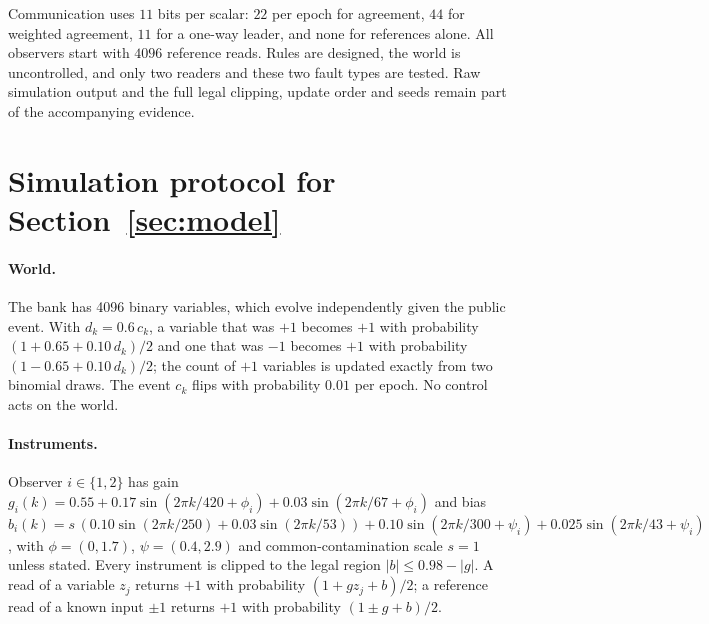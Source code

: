 Communication uses \(11\) bits per scalar: \(22\) per epoch for
agreement, \(44\) for weighted agreement, \(11\) for a one-way leader,
and none for references alone. All observers start with \(4096\)
reference reads. Rules are designed, the world is uncontrolled, and
only two readers and these two fault types are tested. Raw simulation
output and the full legal clipping, update order and seeds remain
part of the accompanying evidence.


\section{Simulation protocol for Section~\ref{sec:model}}\label{app:protocol}

\paragraph{World.} The bank has 4096 binary variables, which evolve independently given the public event. With $d_k=0.6\,c_k$, a variable that was $+1$ becomes $+1$ with probability $(1+0.65+0.10\,d_k)/2$ and one that was $-1$ becomes $+1$ with probability $(1-0.65+0.10\,d_k)/2$; the count of $+1$ variables is updated exactly from two binomial draws. The event $c_k$ flips with probability $0.01$ per epoch. No control acts on the world.

\paragraph{Instruments.} Observer $i\in\{1,2\}$ has gain $g_i(k)=0.55+0.17\sin(2\pi k/420+\phi_i)+0.03\sin(2\pi k/67+\phi_i)$ and bias $b_i(k)=s\,(0.10\sin(2\pi k/250)+0.03\sin(2\pi k/53))+0.10\sin(2\pi k/300+\psi_i)+0.025\sin(2\pi k/43+\psi_i)$, with $\phi=(0,1.7)$, $\psi=(0.4,2.9)$ and common-contamination scale $s=1$ unless stated. Every instrument is clipped to the legal region $|b|\le0.98-|g|$. A read of a variable $z_j$ returns $+1$ with probability $(1+g z_j+b)/2$; a reference read of a known input $\pm1$ returns $+1$ with probability $(1\pm g+b)/2$.

